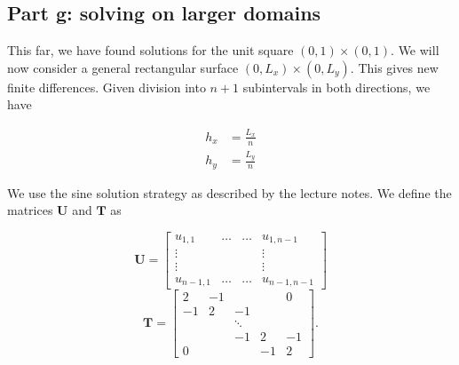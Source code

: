 
\subsection{Part g: solving on larger domains}
This far, we have found solutions for the unit square $(0, 1) \times (0,1)$. We will now consider a general rectangular surface $(0, L_x) \times (0,L_y)$. This gives new finite differences. Given division into $n+1$ subintervals in both directions, we have






\begin{align}
h_x &= \frac{L_x}{n} \\
h_y &= \frac{L_y}{n}
\end{align}

We use the sine solution strategy as described by the lecture notes. We define the matrices $\mathbf{U}$ and $\mathbf{T}$ as

\begin{equation}
  \mathbf{{U}} = 
  \begin{bmatrix}
    u_{1,1} & \ldots & \ldots & u_{1,n-1} \\
    \vdots & & & \vdots \\
    \vdots & & & \vdots \\
    u_{n-1,1} & \ldots & \ldots & u_{n-1,n-1}
  \end{bmatrix}
\end{equation}
\begin{equation}
  \mathbf{{T}} = 
  \begin{bmatrix}
    2 & -1 & & & 0 \\
    -1 & 2 & -1 & & \\
    & & \ddots & & \\
    & & -1 & 2 & -1 \\
    0 & & & -1 & 2
  \end{bmatrix}.
\end{equation}

